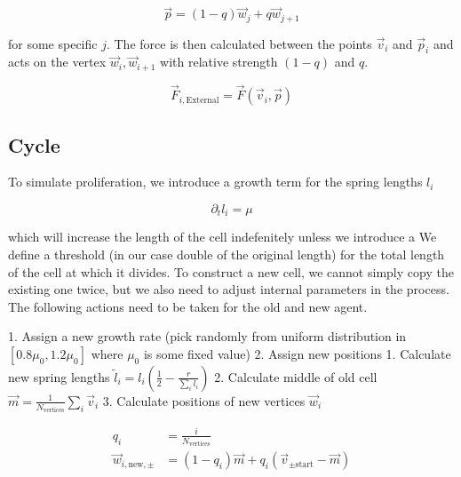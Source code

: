 \documentclass{article}
\begin{document}
\begin{equation}
    \vec{p} = (1-q)\vec{w}_j + q\vec{w}_{j+1}
   \label{connection}
\end{equation}

for some specific $j$.
The force is then calculated between the points $\vec{v}_i$ and $\vec{p}_i$ and acts on
the vertex $\vec{w}_i,\vec{w}_{i+1}$ with relative strength $(1-q)$ and $q$.

\begin{equation}
    \vec{F}_{i,\text{External}} = \vec{F}(\vec{v}_i,\vec{p})
    \label{force-external}
\end{equation}



\subsection{Cycle}

To simulate proliferation, we introduce a growth term for the spring lengths $l_i$

\begin{equation}
    \partial_t l_i = \mu
    \label{growth-ode}
\end{equation}

which will increase the length of the cell indefenitely unless we introduce a
We define a threshold (in our case double of the original length) for the total length of the
cell at which it divides.
To construct a new cell, we cannot simply copy the existing one twice, but we also need to adjust
internal parameters in the process.
The following actions need to be taken for the old and new agent.


1. Assign a new growth rate (pick randomly from uniform distribution in $[0.8\mu_0,1.2\mu_0]$
   where $\mu_0$ is some fixed value)
2. Assign new positions
    1. Calculate new spring lengths
        $\tilde{l}_i = l_i\left(\frac{1}{2} - \frac{r}{\sum\limits_i l_i}\right)$
    2. Calculate middle of old cell
        $\vec{m} = \frac{1}{N_\text{vertices}}\sum\limits_i\vec{v}_i$
    3. Calculate positions of new vertices $\vec{w}_i$

\begin{align}
    q_i &= \frac{i}{N_\text{vertices}}\\
    \vec{w}_{i,\text{new},\pm} &= (1-q_i)\vec{m} + q_i(\vec{v}_{\pm\text{start}} - \vec{m})
\end{align}
\end{document}
